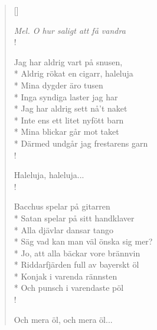 
\settowidth{\versewidth}{Jag har aldrig sett nå't naket}



\begin{verse}[\versewidth]

\flagverse{}
\emph{Mel. O hur saligt att få vandra}\\!

Jag har aldrig vart på snusen,\\*
Aldrig rökat en cigarr, haleluja\\*
Mina dygder äro tusen\\*
Inga syndiga laster jag har\\*
Jag har aldrig sett nå't naket\\*
Inte ens ett litet nyfött barn\\*
Mina blickar går mot taket\\*
Därmed undgår jag frestarens garn\\!

\flagverse{}
Haleluja, haleluja...\\!

Bacchus spelar på gitarren\\*
Satan spelar på sitt handklaver\\*
Alla djävlar dansar tango\\*
Säg vad kan man väl önska sig mer?\\*
Jo, att alla bäckar vore brännvin\\*
Riddarfjärden full av bayerskt öl\\*
Konjak i varenda rännsten\\*
Och punsch i varendaste pöl\\!

\flagverse{}
Och mera öl, och mera öl... 


\end{verse}

